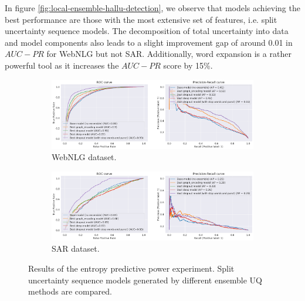 In figure \ref{fig:local-ensemble-hallu-detection}, we observe that models achieving the best performance are those with the most extensive set of features, i.e. split uncertainty sequence models. The decomposition of total uncertainty into data and model components also leads to a slight improvement gap of around 0.01 in $AUC-PR$ for WebNLG but not SAR. Additionally, word expansion is a rather powerful tool as it increases the $AUC-PR$ score by 15\%. 

\begin{figure}[!ht]
     \centering
     \begin{subfigure}[b]{0.95\textwidth}
         \centering
         \includegraphics[width=\textwidth]{figures/eval/entropy_pred_power/webnlg_hd_results.png}
         \caption{WebNLG dataset.}
         \label{fig:webnlg-hallu-detection-best-results}
     \end{subfigure}
     \hfill
     \begin{subfigure}[b]{0.95\textwidth}
         \centering
         \includegraphics[width=\textwidth]{figures/eval/entropy_pred_power/SAR_hallu_results.png}
         \caption{SAR dataset.}
         \label{fig:sar-hallu-detection-best-results}
     \end{subfigure}
     \hfill
       \caption{Results of the entropy predictive power experiment. Split uncertainty sequence models generated by different ensemble UQ methods are compared.}
        \label{fig:experiment-hallu-detection}
\end{figure}

